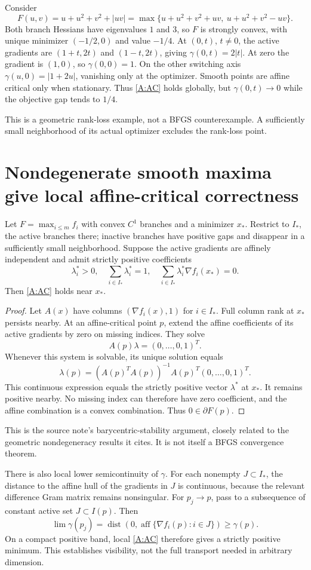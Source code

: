 Consider
\[
 F(u,v)=u+u^2+v^2+|uv|
 =\max\{u+u^2+v^2+uv,\ u+u^2+v^2-uv\}.
\]
Both branch Hessians have eigenvalues $1$ and $3$, so $F$ is strongly convex, with unique minimizer $(-1/2,0)$ and value $-1/4$. At $(0,t)$, $t\ne0$, the active gradients are $(1+t,2t)$ and $(1-t,2t)$, giving $\gamma(0,t)=2|t|$. At zero the gradient is $(1,0)$, so $\gamma(0,0)=1$. On the other switching axis $\gamma(u,0)=|1+2u|$, vanishing only at the optimizer. Smooth points are affine critical only when stationary. Thus \eqref{A:AC} holds globally, but $\gamma(0,t)\to0$ while the objective gap tends to $1/4$.

This is a geometric rank-loss example, not a BFGS counterexample. A sufficiently small neighborhood of its actual optimizer excludes the rank-loss point.

\section{Nondegenerate smooth maxima give local affine-critical correctness}
Let $F=\max_{i\le m}f_i$ with convex $C^1$ branches and a minimizer $x_*$. Restrict to $I_*$, the active branches there; inactive branches have positive gaps and disappear in a sufficiently small neighborhood. Suppose the active gradients are affinely independent and admit strictly positive coefficients
\[
 \lambda_i^*>0,\quad\sum_{i\in I_*}\lambda_i^*=1,
 \quad\sum_{i\in I_*}\lambda_i^*\nabla f_i(x_*)=0.
\]
Then \eqref{A:AC} holds near $x_*$.

\begin{proof}
Let $A(x)$ have columns $(\nabla f_i(x),1)$ for $i\in I_*$. Full column rank at $x_*$ persists nearby. At an affine-critical point $p$, extend the affine coefficients of its active gradients by zero on missing indices. They solve
\[
 A(p)\lambda=(0,\ldots,0,1)^T.
\]
Whenever this system is solvable, its unique solution equals
\[
 \lambda(p)=(A(p)^TA(p))^{-1}A(p)^T(0,\ldots,0,1)^T.
\]
This continuous expression equals the strictly positive vector $\lambda^*$ at $x_*$. It remains positive nearby. No missing index can therefore have zero coefficient, and the affine combination is a convex combination. Thus $0\in\partial F(p)$.
\end{proof}
This is the source note's barycentric-stability argument, closely related to the geometric nondegeneracy results it cites. It is not itself a BFGS convergence theorem.

There is also local lower semicontinuity of $\gamma$. For each nonempty $J\subset I_*$, the distance to the affine hull of the gradients in $J$ is continuous, because the relevant difference Gram matrix remains nonsingular. For $p_j\to p$, pass to a subsequence of constant active set $J\subset I(p)$. Then
\[
 \lim\gamma(p_j)=\operatorname{dist}(0,\operatorname{aff}\{\nabla f_i(p):i\in J\})\ge\gamma(p).
\]
On a compact positive band, local \eqref{A:AC} therefore gives a strictly positive minimum. This establishes visibility, not the full transport needed in arbitrary dimension.

